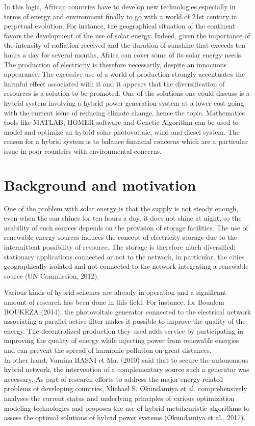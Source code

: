 \documentclass[11.8pt,a4paper]{article}
\begin{document}
In this logic, African countries have to develop new technologies especially in terms of energy and environment finally to go with a world of 21st century in perpetual evolution. For instance, the geographical situation of the continent favors the development of the use of solar energy. Indeed, given the importance of the intensity of radiation received and the duration of sunshine that exceeds ten hours a day for several months, Africa can cover some of its solar energy needs. The production of electricity is therefore necessarily, despite an innocuous appearance. The excessive use of a world of production strongly accentuates the harmful effect associated with it and it appears that the diversification of resources is a solution to be promoted. One of the solutions one could discuss is a hybrid system involving a hybrid power generation system at a lower cost going with the current issue of reducing climate change, hence the topic. Mathematics tools like MATLAB, HOMER software and Genetic Algorithm can be used to model and optimize an hybrid solar photovoltaic, wind and diesel system. The reason for a hybrid system is to balance financial concerns which are a particular issue in poor countries with environmental concerns.
\section{Background and motivation}
One of the problem with solar energy is that the supply is not steady enough, even when the sun shines for ten hours a day, it does not shine at night, so the usability of such sources depends on the provision of storage facilities. The use of renewable energy sources induces the concept of electricity storage due to the intermittent possibility of resource. The storage is therefore much diversified: stationary applications connected or not to the network, in particular, the cities geographically isolated and not connected to the network integrating a renewable source (UN Commission, 2012). 

Various kinds of hybrid schemes are already in operation and a significant amount of research has been done in this field. For instance, for Boualem BOUKEZA (2014), the photovoltaic generator connected to the electrical network associating a parallel active filter makes it possible to improve the quality of the energy. The decentralized production they used adds service by participating in improving the quality of energy while injecting power from renewable energies and can prevent the spread of harmonic pollution on great distances. \\
In other hand, Vamina HASNI et Ma. (2010) said that to secure the autonomous hybrid network, the intervention of a complementary source such a generator was necessary. As part of research efforts to address the major energy-related problems of developing countries, Michael S. Okundamiya et al. comprehensively analyses the current status and underlying principles of various optimization modeling technologies and proposes the use of hybrid metaheuristic algorithms to assess the optimal solutions of hybrid power systems (Okundamiya et al., 2017).\\
\end{document}
